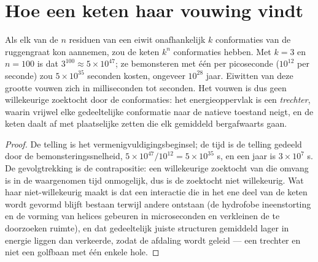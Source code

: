 \section{Hoe een keten haar vouwing vindt}

\begin{theorem}\label{thm:b3:structural-biology:levinthal}
Als elk van de $n$ residuen van een eiwit onafhankelijk $k$
conformaties van de ruggengraat kon aannemen, zou de keten $k^{n}$
conformaties hebben. Met $k = 3$ en $n = 100$ is dat $3^{100} \approx
5\times 10^{47}$; ze bemonsteren met één per picoseconde ($10^{12}$ per
seconde) zou $5\times 10^{35}$ seconden kosten, ongeveer $10^{28}$
jaar. Eiwitten van deze grootte vouwen zich in milliseconden tot
seconden. Het vouwen is dus geen willekeurige zoektocht door de
conformaties: het energieoppervlak is een \emph{trechter}, waarin
vrijwel elke gedeeltelijke conformatie naar de natieve toestand neigt,
en de keten daalt af met plaatselijke zetten die elk gemiddeld
bergafwaarts gaan.
\end{theorem}
\begin{proof}
De telling is het vermenigvuldigingsbeginsel; de tijd is de telling
gedeeld door de bemonsteringssnelheid,
$5\times 10^{47}/10^{12} = 5\times
10^{35}$ s, en een jaar is $3\times 10^{7}$ s. De gevolgtrekking is de
contrapositie: een willekeurige zoektocht van die omvang is in de
waargenomen tijd onmogelijk, dus is de zoektocht niet willekeurig. Wat
haar niet-willekeurig maakt is dat een interactie die in het ene deel
van de keten wordt gevormd blijft bestaan terwijl andere ontstaan (de
hydrofobe ineenstorting en de vorming van helices gebeuren in
microseconden en verkleinen de te doorzoeken ruimte), en dat
gedeeltelijk juiste structuren gemiddeld lager in energie liggen dan
verkeerde, zodat de afdaling wordt geleid --- een trechter en niet een
golfbaan met één enkele hole.
\end{proof}

